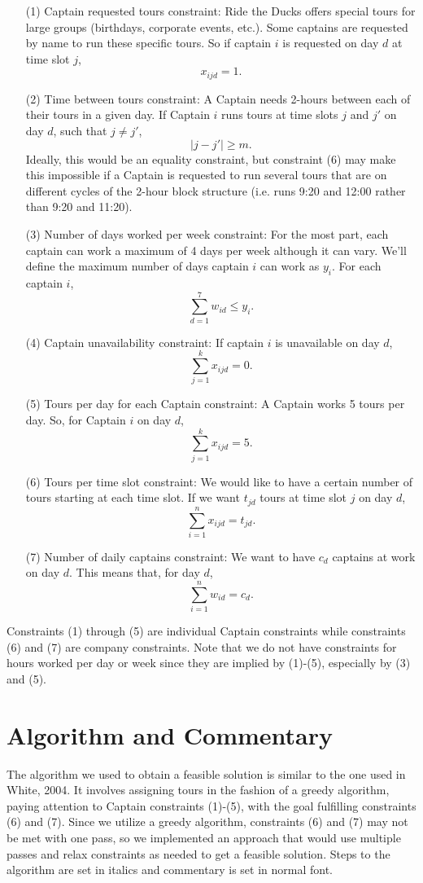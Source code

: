 \documentclass[12pt]{article}
\begin{document}
\begin{enumerate}
\item[(1)] Captain requested tours constraint: Ride the Ducks offers special tours for large groups (birthdays, corporate events,  etc.). Some captains are requested by name to run these specific tours. So if captain $i$ is requested on
day $d$ at time slot $j$,
$$x_{ijd} = 1.$$
\item[(2)] Time between tours constraint: A Captain needs 2-hours between each of their tours in a given day. 
If Captain $i$ runs tours at time slots $j$ and $j'$ on day $d$, such that $j \neq j'$,
$$\lvert j - j'\rvert \ge m.$$
Ideally, this would be an equality constraint, but constraint (6) may make this impossible if a Captain is requested to run several tours that are on different cycles of the 2-hour block structure (i.e. runs 9:20 and 12:00 rather than 9:20 and 11:20). 
\item[(3)] Number of days worked per week constraint: For the most part, each captain can work a maximum of 4 days per week although it can vary. We'll define the maximum number of days captain $i$ can work as $y_i$.
For each captain $i$,
$$\sum_{d = 1}^{7}w_{id}\le y_i.$$
\item[(4)] Captain unavailability constraint: If captain $i$ is unavailable on day $d$,
$$\sum_{j = 1}^{k}{x_{ijd}} = 0.$$
\item[(5)] Tours per day for each Captain constraint: A Captain works 5 tours per day. So, for Captain $i$ on day $d$, 
$$\sum_{j = 1}^{k} x_{ijd} = 5.$$
\item[(6)] Tours per time slot constraint: We would like to have a certain number of tours starting at each time slot. If we want $t_{jd}$ tours at time slot $j$ on day $d$,
$$\sum_{i = 1}^{n}{x_{ijd}} = t_{jd}.$$
\item[(7)] Number of daily captains constraint: We want to have $c_d$ captains at work on day $d$. This means that, for day $d$, 
$$\sum_{i = 1}^{n}{w_{id}} = c_d.$$
\end{enumerate}
Constraints (1) through (5) are individual Captain constraints while constraints (6) and (7) are company constraints. Note that we do not have constraints for hours worked per day or week since they are implied by (1)-(5), especially by (3) and (5).

\section*{Algorithm and Commentary}
The algorithm we used to obtain a feasible solution is similar to the one used in White, 2004. It involves assigning tours in the fashion of a greedy algorithm, paying attention to Captain constraints (1)-(5), with the goal fulfilling constraints (6) and (7). Since we utilize a greedy algorithm, constraints (6) and (7) may not be met with one pass, so we implemented an approach that would use multiple passes and relax constraints as needed to get a feasible solution. Steps to the algorithm are set in italics and commentary is set in normal font. 
\end{document}
